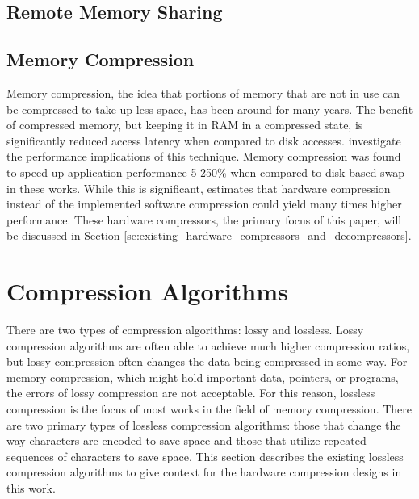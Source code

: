 \documentclass[doublespace,nopageskip]{VTthesis}
\begin{document}
\subsection{Remote Memory Sharing}\label{ss:remote_memory_sharing}

\subsection{Memory Compression}\label{ss:memory_compression}
Memory compression, the idea that portions of memory that are not in use can be compressed to take up less space, has been around for many years. The benefit of compressed memory, but keeping it in RAM in a compressed state, is significantly reduced access latency when compared to disk accesses. \cite{memorycompressionperformance, compressedmemoryimproveperformance} investigate the performance implications of this technique. Memory compression was found to speed up application performance 5-250\% when compared to disk-based swap in these works. While this is significant, \cite{memorycompressionperformance} estimates that hardware compression instead of the implemented software compression could yield many times higher performance. These hardware compressors, the primary focus of this paper, will be discussed in Section \ref{se:existing_hardware_compressors_and_decompressors}.

\section{Compression Algorithms}\label{se:compression_algorithms}
There are two types of compression algorithms: lossy and lossless. Lossy compression algorithms are often able to achieve much higher compression ratios, but lossy compression often changes the data being compressed in some way. For memory compression, which might hold important data, pointers, or programs, the errors of lossy compression are not acceptable. For this reason, lossless compression is the focus of most works in the field of memory compression.
There are two primary types of lossless compression algorithms: those that change the way characters are encoded to save space and those that utilize repeated sequences of characters to save space. This section describes the existing lossless compression algorithms to give context for the hardware compression designs in this work.
\end{document}
